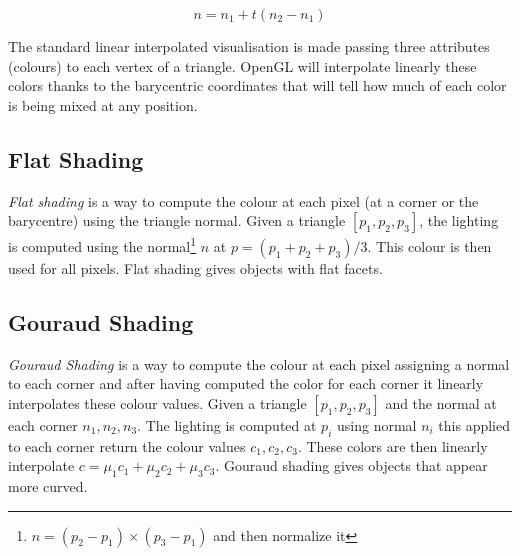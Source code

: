 $$ n = n_1 + t (n_2 - n_1)$$


The standard linear interpolated visualisation is made passing three attributes (colours) to each vertex of a triangle. OpenGL will interpolate linearly these colors thanks to the barycentric coordinates that will tell how much of each color is being mixed at any position.


\subsection{Flat Shading}
\textit{Flat shading} is a way to compute the colour at each pixel (at a corner or the barycentre) using the triangle normal.
Given a triangle $[p_1, p_2, p_3]$, the lighting is computed using the normal\footnote{$ \widehat{n} = (p_2 - p_1) \times (p_3 - p_1)$ and then normalize it} $n$ at $p= (p_1 + p_2 + p_3)/3$. This colour is then used for all pixels. Flat shading gives objects with flat facets.
\cite{SLIDE:ICORSI}

\subsection{Gouraud Shading}
\textit{Gouraud Shading} is a way to compute the colour at each pixel assigning a normal to each corner and after having computed the color for each corner it linearly interpolates these colour values.
Given a triangle $[p_1, p_2, p_3]$ and the normal at each corner $n_1, n_2, n_3$.
The lighting is computed at $p_i$ using normal $n_i$ this applied to each corner return the colour values $c_1, c_2, c_3$.
These colors are then linearly interpolate $c = {\mu}_1 c_1 + {\mu}_2 c_2 + {\mu}_3 c_3$. Gouraud shading gives objects that appear more curved. \cite{SLIDE:ICORSI}


